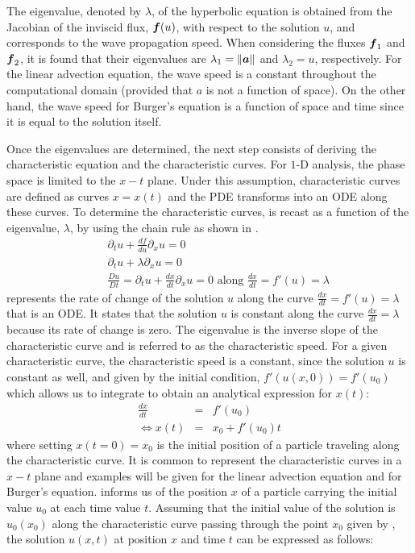 The eigenvalue, denoted by $\lambda$, of the hyperbolic equation is obtained from the Jacobian of the inviscid flux, $\boldsymbol f(u)$, with respect to the solution $u$, and corresponds to the wave propagation speed. When considering the fluxes $\boldsymbol f_1$ and $\boldsymbol f_2$, it is found that their eigenvalues are $\lambda_1 = \|\boldsymbol a\|$ and $\lambda_2 = u$, respectively. For the linear advection equation, the wave speed is a constant throughout the computational domain (provided that $a$ is not a function of space). On the other hand, the wave speed for Burger's equation is a function of space and time since it is equal to the solution itself.

Once the eigenvalues are determined, the next step consists of deriving the characteristic equation and the characteristic curves. For $1$-D analysis, the phase space is limited to the $x-t$ plane. Under this assumption, characteristic curves are defined as curves $x = x(t)$ and the PDE transforms into an ODE \cite{Toro} along these curves. To determine the characteristic curves,  is recast as a function of the eigenvalue, $\lambda$, by using the chain rule as shown in .
%
\begin{eqnarray}\label{eq:ivp3_sct1b}
&&\partial_t u + \frac{df}{du}\partial_x u = 0 \nonumber\\
&&\partial_t u + \lambda \partial_x u = 0 \nonumber \\
&&\frac{Du}{Dt} = \partial_t u + \frac{dx}{dt} \partial_x u = 0 \text{ along } \frac{dx}{dt} = f'(u) = \lambda 
\end{eqnarray}
%
 represents the rate of change of the solution $u$ along the curve $\frac{dx}{dt} = f'(u) = \lambda$ that is an ODE. It states that the solution $u$ is constant along the curve $\frac{dx}{dt} = \lambda$ because its rate of change is zero. The eigenvalue is the inverse slope of the characteristic curve and is referred to as the characteristic speed. 
For a given characteristic curve, the characteristic speed is a constant, since the solution $u$ is constant as well, and given by the initial condition, $f'(u(x,0))=f'(u_0)$ which allows us to integrate to obtain an analytical expression for $x(t)$:
%
\begin{eqnarray}\label{eq:ivp4_sct1b}
\frac{dx}{dt} &=& f'(u_0) \nonumber \\
\Leftrightarrow x(t) &=& x_0 + f'(u_0)t
\end{eqnarray}
%
where setting $x(t=0) = x_0$ is the initial position of a particle traveling along the characteristic curve. It is common to represent the characteristic curves in a $x-t$ plane and examples will be given for the linear advection equation and for Burger's equation.  informs us of the position $x$ of a particle carrying the initial value $u_0$ at each time value $t$. Assuming that the initial value of the solution is $u_0(x_0)$ along the characteristic curve passing through the point $x_0$ given by , the solution $u(x,t)$ at position $x$ and time $t$ can be expressed as follows:
